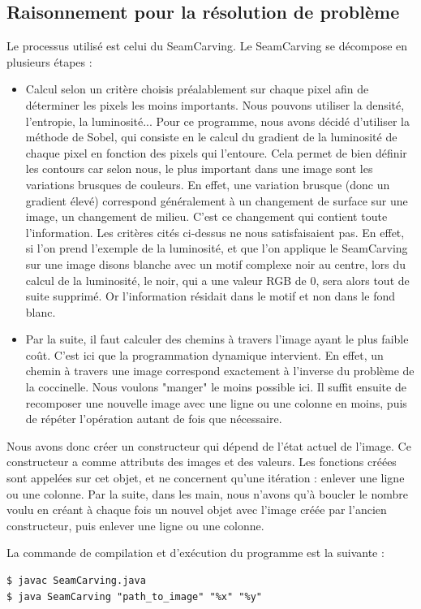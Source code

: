 \documentclass[12pt]{article}
\begin{document}
\subsection{Raisonnement pour la résolution de problème}
Le processus utilisé est celui du SeamCarving. Le SeamCarving se décompose en plusieurs étapes :
\begin{itemize}
    \item Calcul selon un critère choisis préalablement sur chaque pixel afin de déterminer les pixels les moins importants. Nous pouvons utiliser la densité, l'entropie, la luminosité... Pour ce programme, nous avons décidé d'utiliser la méthode de Sobel, qui consiste en le calcul du gradient de la luminosité de chaque pixel en fonction des pixels qui l'entoure. Cela permet de bien définir les contours car selon nous, le plus important dans une image sont les variations brusques de couleurs. En effet, une variation brusque (donc un gradient élevé) correspond généralement à un changement de surface sur une image, un changement de milieu. C'est ce changement qui contient toute l'information. Les critères cités ci-dessus ne nous satisfaisaient pas. En effet, si l'on prend l'exemple de la luminosité, et que l'on applique le SeamCarving sur une image disons blanche avec un motif complexe noir au centre, lors du calcul de la luminosité, le noir, qui a une valeur RGB de 0, sera alors tout de suite supprimé. Or l'information résidait dans le motif et non dans le fond blanc.

    \item Par la suite, il faut calculer des chemins à travers l'image ayant le plus faible coût. C'est ici que la programmation dynamique intervient. En effet, un chemin à travers une image correspond exactement à l'inverse du problème de la coccinelle. Nous voulons "manger" le moins possible ici. Il suffit ensuite de recomposer une nouvelle image avec une ligne ou une colonne en moins, puis de répéter l'opération autant de fois que nécessaire.
\end{itemize}
\newpage
Nous avons donc créer un constructeur qui dépend de l'état actuel de l'image. Ce constructeur a comme attributs des images et des valeurs. Les fonctions créées sont appelées sur cet objet, et ne concernent qu'une itération : enlever une ligne ou une colonne. Par la suite, dans les main, nous n'avons qu'à boucler le nombre voulu en créant à chaque fois un nouvel objet avec l'image créée par l'ancien constructeur, puis enlever une ligne ou une colonne.

La commande de compilation et d'exécution du programme est la suivante :
\begin{lstlisting}
$ javac SeamCarving.java
$ java SeamCarving "path_to_image" "%x" "%y"
\end{lstlisting}
\end{document}
